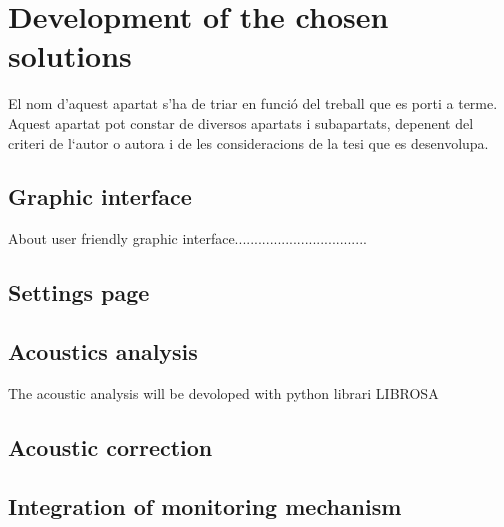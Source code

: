\chapter{Development of the chosen solutions}

El nom d’aquest apartat s'ha de triar en funció del treball que es porti a terme. Aquest apartat pot constar de diversos apartats i subapartats, depenent del criteri de l‘autor o autora i de les consideracions de la tesi que es desenvolupa.

\section{Graphic interface}

About user friendly graphic interface..................................

\section{Settings page}


\section{Acoustics analysis}

The acoustic analysis will be devoloped with python librari LIBROSA\cite{BibEntry2025Feb}

\section{Acoustic correction}


\section{Integration of monitoring mechanism}